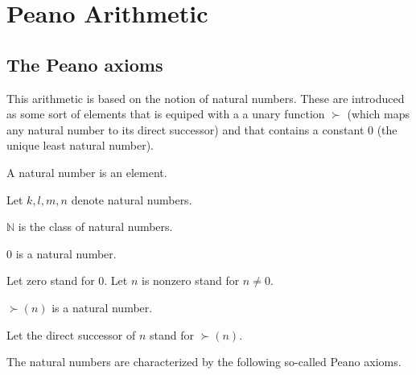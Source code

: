 \documentclass[../../arithmetic.tex]{subfiles}
\begin{document}
  \section{Peano Arithmetic}

  \begin{forthel}
  \end{forthel}

  \begin{forthel}
  \end{forthel}


  \subsection{The Peano axioms}

  This arithmetic is based on the notion of natural numbers.
  These are introduced as some sort of elements that is equiped with a a unary
  function $\succ$ (which maps any natural number to its direct successor)
  and that contains a constant $0$ (the unique least natural number).

  \begin{forthel}
    \begin{signature}
      A natural number is an element.
    \end{signature}

    Let $k,l,m,n$ denote natural numbers.

    \begin{definition}
      $\mathbb{N}$ is the class of natural numbers.
    \end{definition}

    \begin{signature}
      $0$ is a natural number.
    \end{signature}

    Let zero stand for $0$.
    Let $n$ is nonzero stand for $n \neq 0$.

    \begin{signature}
      $\succ(n)$ is a natural number.
    \end{signature}

    Let the direct successor of $n$ stand for $\succ(n)$.
  \end{forthel}

  \noindent The natural numbers are characterized by the following so-called
  Peano axioms.
\end{document}
